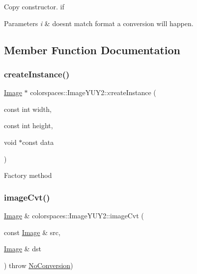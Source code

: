 Copy constructor. if 
\begin{DoxyParams}{Parameters}
{\em i} & doesn\textquotesingle{}t match format a conversion will happen. \\
\hline
\end{DoxyParams}


\subsection{Member Function Documentation}
\mbox{\label{classcolorspaces_1_1_image_y_u_y2_aa9b60cfc9b469d0e20a3190fa5d91d2e}} 
\subsubsection{\texorpdfstring{create\+Instance()}{createInstance()}}
{\footnotesize\ttfamily \hyperlink{classcolorspaces_1_1_image}{Image} $\ast$ colorspaces\+::\+Image\+Y\+U\+Y2\+::create\+Instance (\begin{DoxyParamCaption}\item[{const int}]{width,  }\item[{const int}]{height,  }\item[{void $\ast$const}]{data }\end{DoxyParamCaption})\hspace{0.3cm}{\ttfamily [static]}}

Factory method \mbox{\label{classcolorspaces_1_1_image_y_u_y2_aaa26a6af0f8e2f36d35d65a5dcb0a25a}} 
\subsubsection{\texorpdfstring{image\+Cvt()}{imageCvt()}}
{\footnotesize\ttfamily \hyperlink{classcolorspaces_1_1_image}{Image} \& colorspaces\+::\+Image\+Y\+U\+Y2\+::image\+Cvt (\begin{DoxyParamCaption}\item[{const \hyperlink{classcolorspaces_1_1_image}{Image} \&}]{src,  }\item[{\hyperlink{classcolorspaces_1_1_image}{Image} \&}]{dst }\end{DoxyParamCaption}) throw  \hyperlink{classcolorspaces_1_1_image_1_1_no_conversion}{No\+Conversion}) \hspace{0.3cm}{\ttfamily [static]}}

